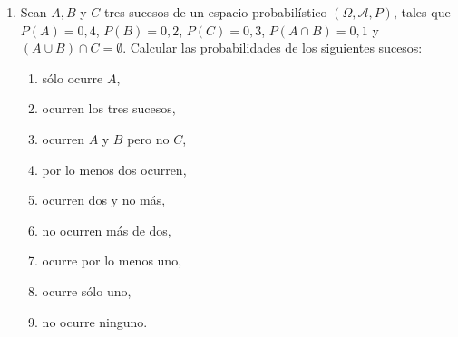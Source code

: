 \documentclass[a4paper,12pt]{article}
\begin{document}
\begin{enumerate}
\begin{enumerate}[label=\alph*)]
        \item que una persona viaje en metro o en coche, pero no en autobús;\\
    La probabilidad de que una persona viaje en metro o en coche, pero no en autobús es: $P((M\cup C)\cap \bar A) = P(M\cap \bar A) + P(C \cap \bar A) - P(M \cap C \cap \bar A) = [P(M) - P(M\cap A)] + [P(C) - P(C\cap A)] + [P(M\cap C) - P (M\cap C \cap A)] = 0,33$
    
        \item que viaje en metro, o bien en autobús y en coche;\\
    La probabilidad de que una persona viaje en metro y no en autobús es: $P(M\cup (A\cap C)) = P(M) + P(A\cap C) - P(M\cap A \cap C) = 0,34$
    
        \item que una persona vaya a pie;\\
    No podemos saber la probabilidad de que una persona vaya a pie, puesto que no conocemos el espacio muestral completo, por lo que no sabemos si existen más medios de transporte con una probabilidad distinta de 0. Bajo la hipótesis de que no existen, entonces sí podríamos calcular la probabilidad de que una persona vaya a pie, que sería el complementario a las probabilidades de las uniones de los demás modos de transporte:
    $P($Ir a pie$) = P\overline{(M\cup A \cup C)} = 1- [P(M\cup A \cup C) = 1-P(M) +P(A) + P(C) - P(M\cap A) - P(M \cap C) - P(A\cap C) + P(M\cap A \cap C)]= 0,55$
    
    \end{enumerate}
    
\item Sean \(A, B\) y \(C\) tres sucesos de un espacio probabilístico \((\Omega, \mathcal{A}, P)\), tales que \(P(A) = 0{,}4\), \(P(B) = 0{,}2\), \(P(C) = 0{,}3\), \(P(A \cap B) = 0{,}1\) y \((A \cup B) \cap C = \emptyset\). Calcular las probabilidades de los siguientes sucesos:
    \begin{enumerate}[label=\alph*)]
    \item sólo ocurre \(A\),
    \item ocurren los tres sucesos,
    \item ocurren \(A\) y \(B\) pero no \(C\),
    \item por lo menos dos ocurren,
    \item ocurren dos y no más,
    \item no ocurren más de dos,
    \item ocurre por lo menos uno,
    \item ocurre sólo uno,
    \item no ocurre ninguno.
    \end{enumerate}
    

\end{enumerate}
\end{document}
